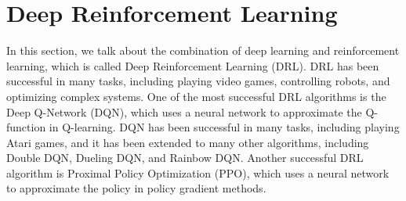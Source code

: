\section{Deep Reinforcement Learning}

In this section, we talk about the combination of deep learning and reinforcement learning, which is called Deep Reinforcement Learning (DRL).
DRL has been successful in many tasks, including playing video games, controlling robots, and optimizing complex systems.
One of the most successful DRL algorithms is the Deep Q-Network (DQN), which uses a neural network to approximate the Q-function in Q-learning.
DQN has been successful in many tasks, including playing Atari games, and it has been extended to many other algorithms, including Double DQN, Dueling DQN, and Rainbow DQN.
Another successful DRL algorithm is Proximal Policy Optimization (PPO), which uses a neural network to approximate the policy in policy gradient methods.
